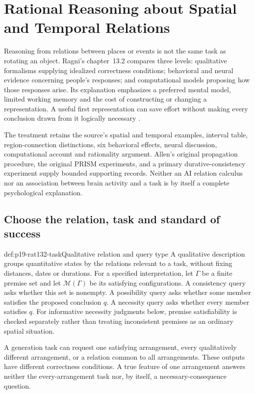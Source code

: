 \chapter{Rational Reasoning about Spatial and Temporal Relations}
\label{sec:p19-rationality-13-2}

Reasoning from relations between places or events is not the same task as
rotating an object. Ragni's chapter~13.2 compares three levels: qualitative
formalisms supplying idealized correctness conditions; behavioral and neural
evidence concerning people's responses; and computational models proposing
how those responses arise. Its explanation emphasizes a preferred mental
model, limited working memory and the cost of constructing or changing a
representation. A useful first representation can save effort without making
every conclusion drawn from it logically necessary
\cite[pp.~725--733]{Ragni2021SpatialTemporal}.

The treatment retains the source's spatial and temporal examples, interval
table, region-connection distinctions, six behavioral effects, neural
discussion, computational account and rationality argument. Allen's original
propagation procedure, the original PRISM experiments, and a primary
durative-consistency experiment supply bounded supporting records. Neither
an AI relation calculus nor an association between brain activity and a task
is by itself a complete psychological explanation.

\section{Choose the relation, task and standard of success}
\label{sec:p19-rat132-tasks}

\begin{hbdefinition}{def:p19-rat132-task}{Qualitative relation and query type}
A qualitative description groups quantitative states by the relations
relevant to a task, without fixing distances, dates or durations. For a
specified interpretation, let \(\Gamma\) be a finite premise set and let
\(\mathcal M(\Gamma)\) be its satisfying configurations. A consistency
query asks whether this set is nonempty. A possibility query asks whether
some member satisfies the proposed conclusion \(q\). A necessity query asks
whether every member satisfies \(q\). For informative necessity judgments
below, premise satisfiability is checked separately rather than treating
inconsistent premises as an ordinary spatial situation.

A generation task can request one satisfying arrangement, every qualitatively
different arrangement, or a relation common to all arrangements. These
outputs have different correctness conditions. A true feature of one
arrangement answers neither the every-arrangement task nor, by itself, a
necessary-consequence question.
\end{hbdefinition}

